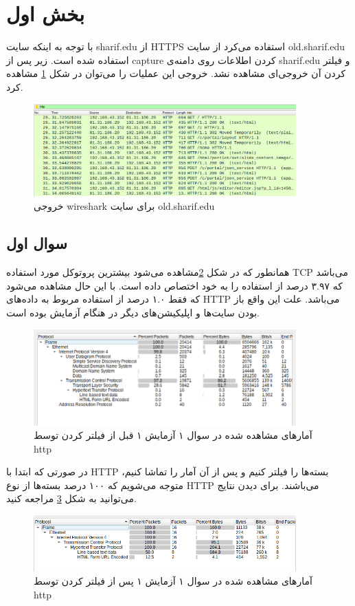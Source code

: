 \documentclass{article}
\begin{document}
\section{بخش اول}
با توجه به اینکه سایت sharif.edu از HTTPS استفاده می‌کرد از سایت old.sharif.edu استفاده شده است. زیر پس از capture کردن اطلاعات روی دامنه‌ی sharif.edu و فیلتر کردن آن خروجی‌ای مشاهده نشد. خروجی این عملیات را می‌توان در شکل \ref{fig:result} مشاهده کرد.
\begin{figure}[h!]
	\centering
	\includegraphics[width=0.9\textwidth]{src/result.png}
	\caption{
خروجی wireshark برای سایت old.sharif.edu	
}
	\label{fig:result}
\end{figure}

\subsection{سوال اول}
همانطور که در شکل \ref{fig:stat}مشاهده می‌شود بیشترین پروتوکل مورد استفاده TCP می‌باشد که ۳.۹۷ درصد از استفاده را به خود اختصاص داده است. با این حال مشاهده می‌شود که فقط ۱.۰ درصد از استفاده مربوط به داده‌های HTTP می‌باشد. علت این واقع باز بودن سایت‌ها و اپلیکیشن‌های دیگر در هنگام آزمایش بوده است. 
\begin{figure}[h!]
	\centering
	\includegraphics[width=0.9\textwidth]{src/stat.png}
	\caption{آمار‌های مشاهده شده در سوال ۱ آزمایش ۱ قبل از فیلتر کردن توسط http}
	\label{fig:stat}
\end{figure}

در  صورتی که ابتدا با HTTP بسته‌ها را فیلتر کنیم و پس از آن آمار را تماشا کنیم، متوجه می‌شویم که ۱۰۰ درصد بسته‌ها از نوع HTTP می‌باشند. برای دیدن نتایج می‌توانید به شکل \ref{fig:stat2} مراجعه کنید.
\begin{figure}[h!]
	\centering
	\includegraphics[width=0.9\textwidth]{src/stat2.png}
	\caption{آمار‌های مشاهده شده در سوال ۱ آزمایش ۱ پس از فیلتر کردن توسط http}
	\label{fig:stat2}
\end{figure}
\end{document}
